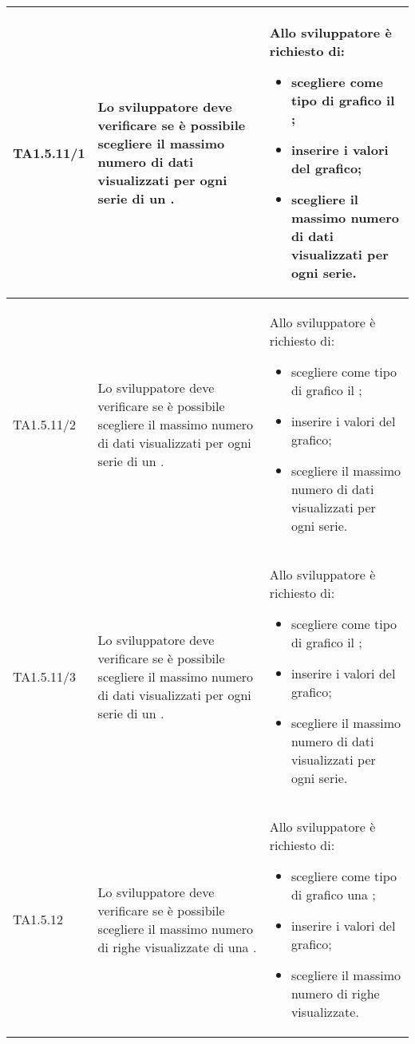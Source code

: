 \begin{longtabu}{| X[0.5] | X | X |}
	TA1.5.11/1 & Lo sviluppatore deve verificare se è possibile scegliere il massimo numero di dati visualizzati per ogni serie di un .

		& Allo sviluppatore è richiesto di:
		\begin{itemize}
			\item scegliere come tipo di grafico il ;
			\item inserire i valori del grafico;
			\item scegliere il massimo numero di dati visualizzati per ogni serie.
		\end{itemize}
\\ \hline

	TA1.5.11/2 & Lo sviluppatore deve verificare se è possibile scegliere il massimo numero di dati visualizzati per ogni serie di un .

		& Allo sviluppatore è richiesto di:
		\begin{itemize}
			\item scegliere come tipo di grafico il ;
			\item inserire i valori del grafico;
			\item scegliere il massimo numero di dati visualizzati per ogni serie.
		\end{itemize}
\\ \hline

	TA1.5.11/3 & Lo sviluppatore deve verificare se è possibile scegliere il massimo numero di dati visualizzati per ogni serie di un .

		& Allo sviluppatore è richiesto di:
		\begin{itemize}
			\item scegliere come tipo di grafico il ;
			\item inserire i valori del grafico;
			\item scegliere il massimo numero di dati visualizzati per ogni serie.
		\end{itemize}
\\ \hline

	TA1.5.12 & Lo sviluppatore deve verificare se è possibile scegliere il massimo numero di righe visualizzate di una .

		& Allo sviluppatore è richiesto di:
		\begin{itemize}
			\item scegliere come tipo di grafico una ;
			\item inserire i valori del grafico;
			\item scegliere il massimo numero di righe visualizzate.
		\end{itemize}
\\ \hline


\end{longtabu}

